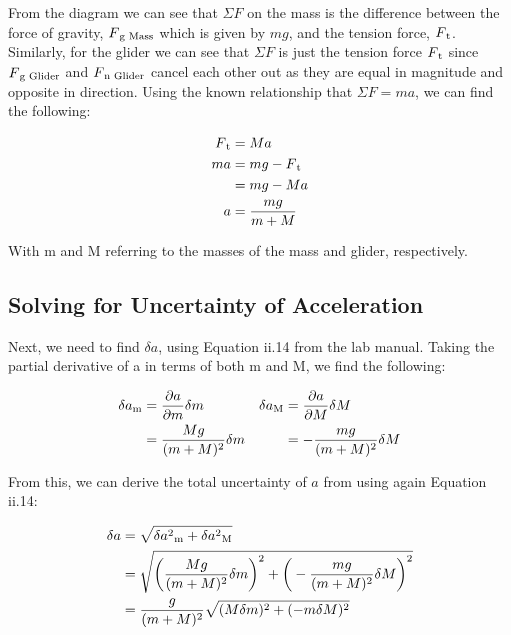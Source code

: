 \documentclass[titlepage]{article}
\begin{document}
From the diagram we can see that $\Sigma F$ on the mass is the difference between the force of gravity, $F\textsubscript{g Mass}$ which is given by $mg$, and the tension force, $F\textsubscript{t}$. Similarly, for the glider we can see that $\Sigma F$ is just the tension force $F\textsubscript{t}$ since $F\textsubscript{g Glider}$ and $F\textsubscript{n Glider}$ cancel each other out as they are equal in magnitude and opposite in direction. Using the known relationship that $\Sigma F=ma$, we can find the following:

\begin{equation}
\begin{split}
 F\textsubscript{t} &= Ma\\
ma &= mg - F\textsubscript{t} \\
&= mg - Ma \\
a &= \frac{mg}{m+M}
\end{split}
\end{equation}

With m and M referring to the masses of the mass and glider, respectively. 

\subsection{Solving for Uncertainty of Acceleration}
Next, we need to find $\delta a$, using Equation ii.14 from the lab manual. Taking the partial derivative of a in terms of both m and M, we find the following:

\begin{align*}
\delta a\textsubscript{m} &= \frac{\partial a}{\partial m}\delta m & \delta a\textsubscript{M} &= \frac{\partial a}{\partial M}\delta M\\
&= \frac{Mg}{(m+M)^2}\delta m & &=-\frac{mg}{(m+M)^2}\delta M
\end{align*}

From this, we can derive the total uncertainty of $a$ from using again Equation ii.14:

\begin{equation}
\begin{split}
\delta a &= \sqrt{\delta a^2\textsubscript{m}+\delta a^2\textsubscript{M}} \\
&= \sqrt{\bigg (\frac{Mg}{(m+M)^2}\delta m\bigg )^2 + \bigg (-\frac{mg}{(m+M)^2}\delta M \bigg )^2} \\
&= \frac{g}{(m+M)^2}\sqrt{(M\delta m)^2 + (-m\delta M)^2}
\end{split}
\end{equation}
\end{document}
